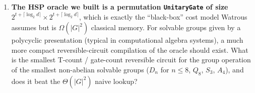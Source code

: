 \begin{enumerate}
\item[Q5.] \textbf{The HSP oracle we built is a permutation \texttt{UnitaryGate} of size
$2^{t+\lceil\log_2 d\rceil} \times 2^{t+\lceil\log_2 d\rceil}$}, which is exactly the
``black-box'' cost model Watrous assumes but is $\Omega(|G|^2)$ classical memory.
For solvable groups given by a polycyclic presentation (typical in computational algebra
systems), a much more compact reversible-circuit compilation of the oracle should exist.
What is the smallest T-count / gate-count reversible circuit for the group operation of
the smallest non-abelian solvable groups ($D_n$ for $n\le 8$, $Q_8$, $S_3$, $A_4$), and
does it beat the $\Theta(|G|^2)$ naive lookup?
\end{enumerate}
